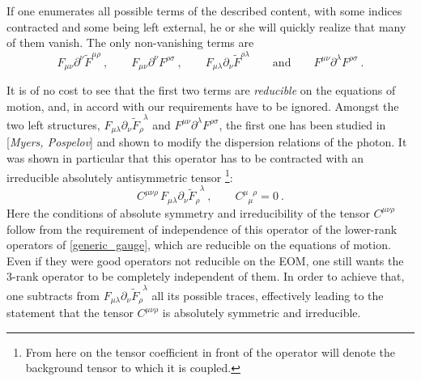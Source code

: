 \documentclass[12pt]{revtex4}
\newcommand{\p}{\partial}
\newcommand{\wt}{\widetilde}
\begin{document}
	If one enumerates all possible terms of the described 
	content, with some indices contracted and some being left external, 
	he or she will quickly realize that many of them vanish. 
	The only non-vanishing terms are
\begin{equation}
\label{generic_gauge}
	F_{\mu\nu} \partial^\nu \widetilde{F}^{\mu\rho}~,\qquad
	F_{\mu\nu} \partial^\nu F^{\rho\sigma}~,\qquad
	F_{\mu\lambda} \partial_\nu \widetilde{F}^{\rho\lambda}\qquad
	\text{and}\qquad
	F^{\mu\nu} \partial^\lambda F^{\rho\sigma}~.
\end{equation}
	
	It is of no cost to see that the first two terms are {\it reducible}
	on the equations of motion, and, in accord with our requirements
	have to be ignored. 
	Amongst the two left structures, 
$ F_{\mu\lambda} \p_\nu \widetilde{F}_\rho^{\phantom{\rho}\lambda} $ and
$ F^{\mu\nu} \partial^\lambda F^{\rho\sigma} $,
	the first one has been studied in [{\it Myers, Pospelov}] and
	shown to modify the dispersion relations of the photon. 
	It was shown in particular that this operator has to be 
	contracted with an
	irreducible absolutely antisymmetric tensor
	\footnote{
	From here on the tensor coefficient in front of the operator
	will denote the background tensor to which it is coupled.}:
\begin{equation}
\label{QED_gauge}
	C^{\mu\nu\rho}\, F_{\mu\lambda} \p_\nu 
	\wt{F}_\rho^{\phantom{\rho}\lambda}~,
	\qquad C^{\mu\phantom{\mu}\rho}_{\phantom{\mu}\mu} = 0~.
\end{equation}
	Here the conditions of absolute symmetry and irreducibility of
	the tensor $ C^{\mu\nu\rho} $ follow from the requirement of
	independence of this operator of the lower-rank operators
	of \eqref{generic_gauge}, which are reducible on the equations
	of motion.
	Even if they were good operators not reducible on the EOM, 
	one still wants the 3-rank operator to be completely independent
	of them.
	In order to achieve that, one subtracts from 
$ F_{\mu\lambda} \p_\nu \wt{F}_\rho^{\phantom{\rho}\lambda} $
	all its possible traces, effectively leading to the statement
	that the tensor $ C^{\mu\nu\rho} $ is absolutely symmetric
	and irreducible.
\end{document}
